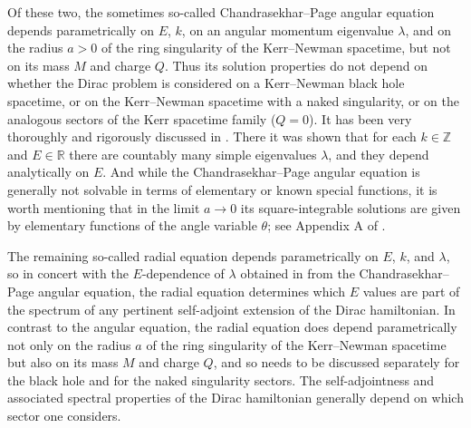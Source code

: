 \documentclass[11 pt]{article}
\newcommand\bbR{{\mathbb R}}
\renewcommand\({\left(}
\renewcommand\){\right)}
\newcommand\<{\langle}
\renewcommand\>{\rangle}
\newcommand\8{\infty}
\newcommand{\Z}{\mathbb{Z}}
\begin{document}
   Of these two, the sometimes so-called Chandrasekhar--Page angular equation depends parametrically on $E$, $k$, on an angular
momentum eigenvalue $\lambda$, and on the radius $a>0$ of the ring singularity of the Kerr--Newman spacetime, but not on
 its mass $M$ and charge $Q$.
   Thus its solution properties do not depend on whether the Dirac problem is considered on %
a Kerr--Newman black hole spacetime, or on the Kerr--Newman spacetime with a naked singularity, or on the analogous sectors of the Kerr spacetime 
family ($Q=0$).
 It has been very thoroughly and rigorously discussed in \cite{BSW}.
 There it was shown that for each $k\in\Z$ and $E\in\bbR$ there are countably many simple eigenvalues $\lambda$, and they depend analytically on $E$.
 And while the Chandrasekhar--Page angular equation is generally not solvable in terms of elementary or known special functions, it is worth 
mentioning that in the limit $a\to 0$ its square-integrable solutions are given by elementary functions of the angle variable $\theta$; 
see Appendix A of \cite{BSW}.

   The remaining so-called radial equation depends parametrically on $E$, $k$, and $\lambda$, so in concert with the $E$-dependence of $\lambda$ obtained 
in \cite{BSW} from the Chandrasekhar--Page angular equation, the radial equation determines which $E$ values are part of the spectrum of any pertinent 
self-adjoint extension of the Dirac hamiltonian.
   In contrast to the angular equation, the radial equation does depend parametrically not only on the radius 
$a$ of the ring singularity of the Kerr--Newman spacetime but also on its mass $M$ and charge $Q$, 
and so needs to be discussed separately for the black hole and for the naked singularity sectors. 
   The self-adjointness and associated spectral properties of the Dirac hamiltonian generally depend on which sector one considers.
\end{document}
